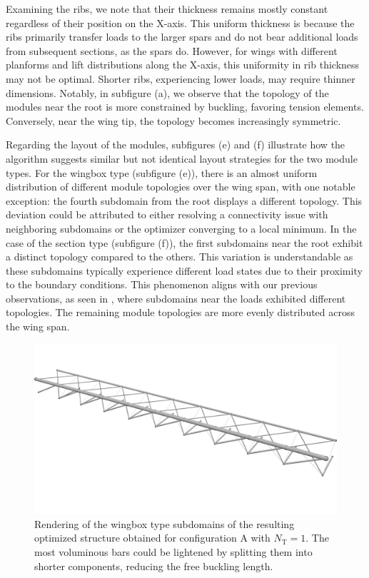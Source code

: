 Examining the ribs, we note that their thickness remains mostly constant regardless of their position on the X-axis. This uniform thickness is because the ribs primarily transfer loads to the larger spars and do not bear additional loads from subsequent sections, as the spars do. However, for wings with different planforms and lift distributions along the X-axis, this uniformity in rib thickness may not be optimal. Shorter ribs, experiencing lower loads, may require thinner dimensions. Notably, in subfigure (a), we observe that the topology of the modules near the root is more constrained by buckling, favoring tension elements. Conversely, near the wing tip, the topology becomes increasingly symmetric.

Regarding the layout of the modules, subfigures (e) and (f) illustrate how the algorithm suggests similar but not identical layout strategies for the two module types. For the wingbox type (subfigure (e)), there is an almost uniform distribution of different module topologies over the wing span, with one notable exception: the fourth subdomain from the root displays a different topology. This deviation could be attributed to either resolving a connectivity issue with neighboring subdomains or the optimizer converging to a local minimum. In the case of the section type (subfigure (f)), the first subdomains near the root exhibit a distinct topology compared to the others. This variation is understandable as these subdomains typically experience different load states due to their proximity to the boundary conditions. This phenomenon aligns with our previous observations, as seen in , where subdomains near the loads exhibited different topologies. The remaining module topologies are more evenly distributed across the wing span.

\begin{figure}
    \centering
    \includegraphics[width=0.8\linewidth]{figures/07_aeronautic/00_NACA_c_1/04_Topology_cell_iso.png}
        \caption{Rendering of the wingbox type subdomains of the resulting optimized structure obtained for configuration A with $N_\text{T}=1$. The most voluminous bars could be lightened by splitting them into shorter components, reducing the free buckling length.}
    \label{fig:07_wingbox_a_nt1}
\end{figure}

